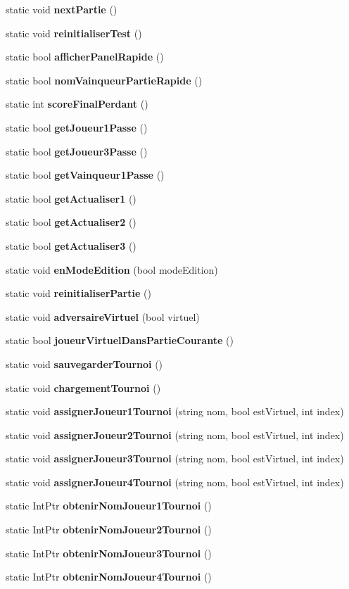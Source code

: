 \begin{DoxyCompactItemize}
static void {\bfseries next\+Partie} ()
\item 
static void {\bfseries reinitialiser\+Test} ()
\item 
static bool {\bfseries afficher\+Panel\+Rapide} ()
\item 
static bool {\bfseries nom\+Vainqueur\+Partie\+Rapide} ()
\item 
static int {\bfseries score\+Final\+Perdant} ()
\item 
static bool {\bfseries get\+Joueur1\+Passe} ()
\item 
static bool {\bfseries get\+Joueur3\+Passe} ()
\item 
static bool {\bfseries get\+Vainqueur1\+Passe} ()
\item 
static bool {\bfseries get\+Actualiser1} ()
\item 
static bool {\bfseries get\+Actualiser2} ()
\item 
static bool {\bfseries get\+Actualiser3} ()
\item 
static void {\bfseries en\+Mode\+Edition} (bool mode\+Edition)
\item 
static void {\bfseries reinitialiser\+Partie} ()
\item 
static void {\bfseries adversaire\+Virtuel} (bool virtuel)
\item 
static bool {\bfseries joueur\+Virtuel\+Dans\+Partie\+Courante} ()
\item 
static void {\bfseries sauvegarder\+Tournoi} ()
\item 
static void {\bfseries chargement\+Tournoi} ()
\item 
static void {\bfseries assigner\+Joueur1\+Tournoi} (string nom, bool est\+Virtuel, int index)
\item 
static void {\bfseries assigner\+Joueur2\+Tournoi} (string nom, bool est\+Virtuel, int index)
\item 
static void {\bfseries assigner\+Joueur3\+Tournoi} (string nom, bool est\+Virtuel, int index)
\item 
static void {\bfseries assigner\+Joueur4\+Tournoi} (string nom, bool est\+Virtuel, int index)
\item 
static Int\+Ptr {\bfseries obtenir\+Nom\+Joueur1\+Tournoi} ()
\item 
static Int\+Ptr {\bfseries obtenir\+Nom\+Joueur2\+Tournoi} ()
\item 
static Int\+Ptr {\bfseries obtenir\+Nom\+Joueur3\+Tournoi} ()
\item 
static Int\+Ptr {\bfseries obtenir\+Nom\+Joueur4\+Tournoi} ()

\end{DoxyCompactItemize}
